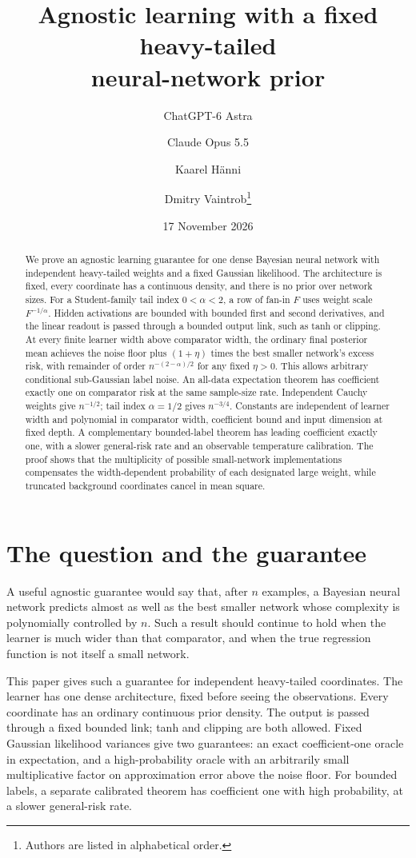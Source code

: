 \documentclass[11pt]{article}
\title{Agnostic learning with a fixed heavy-tailed\\neural-network prior}
\author{ChatGPT-6 Astra \and Claude Opus 5.5 \and Kaarel H\"anni \and
Dmitry Vaintrob\thanks{Authors are listed in alphabetical order.}}
\date{17 November 2026}
\theoremstyle{remark}\newtheorem{remark}[theorem]{Remark}
\begin{document}
\maketitle
\begin{abstract}
We prove an agnostic learning guarantee for one dense Bayesian neural network with independent heavy-tailed weights and a fixed Gaussian likelihood. The architecture is fixed, every coordinate has a continuous density, and there is no prior over network sizes. For a Student-family tail index $0<\alpha<2$, a row of fan-in $F$ uses weight scale $F^{-1/\alpha}$. Hidden activations are bounded with bounded first and second derivatives, and the linear readout is passed through a bounded output link, such as tanh or clipping. At every finite learner width above comparator width, the ordinary final posterior mean achieves the noise floor plus $(1+\eta)$ times the best smaller network's excess risk, with remainder of order $n^{-(2-\alpha)/2}$ for any fixed $\eta>0$. This allows arbitrary conditional sub-Gaussian label noise. An all-data expectation theorem has coefficient exactly one on comparator risk at the same sample-size rate. Independent Cauchy weights give $n^{-1/2}$; tail index $\alpha=1/2$ gives $n^{-3/4}$. Constants are independent of learner width and polynomial in comparator width, coefficient bound and input dimension at fixed depth. A complementary bounded-label theorem has leading coefficient exactly one, with a slower general-risk rate and an observable temperature calibration. The proof shows that the multiplicity of possible small-network implementations compensates the width-dependent probability of each designated large weight, while truncated background coordinates cancel in mean square.
\end{abstract}

\section{The question and the guarantee}
A useful agnostic guarantee would say that, after $n$ examples, a Bayesian neural network predicts almost as well as the best smaller network whose complexity is polynomially controlled by $n$. Such a result should continue to hold when the learner is much wider than that comparator, and when the true regression function is not itself a small network.

This paper gives such a guarantee for independent heavy-tailed coordinates. The learner has one dense architecture, fixed before seeing the observations. Every coordinate has an ordinary continuous prior density. The output is passed through a fixed bounded link; tanh and clipping are both allowed. Fixed Gaussian likelihood variances give two guarantees: an exact coefficient-one oracle in expectation, and a high-probability oracle with an arbitrarily small multiplicative factor on approximation error above the noise floor. For bounded labels, a separate calibrated theorem has coefficient one with high probability, at a slower general-risk rate.
\end{document}
